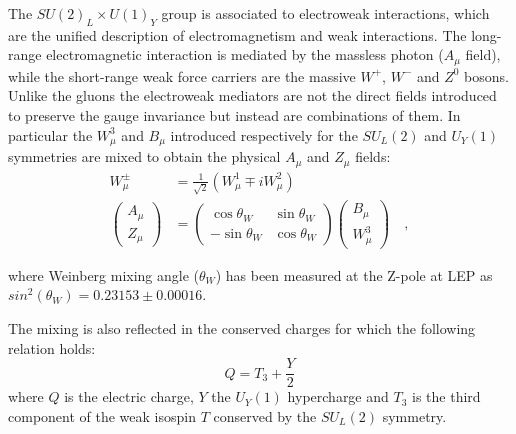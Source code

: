 The $SU(2)_{L} \times U(1)_{Y}$ group is associated to electroweak interactions, which are the
unified description of electromagnetism and weak interactions. The long-range electromagnetic
interaction is mediated by the massless photon ($A_{\mu}$ field), while the short-range weak force carriers are the
massive $W^{+}$, $W^{-}$ and $Z^{0}$ bosons. Unlike the gluons the electroweak mediators
are not the direct fields introduced to preserve the gauge invariance but instead are combinations
of them. In particular the $W_{\mu}^3$ and $B_{\mu}$ introduced respectively for the $SU_L(2)$ and $U_Y(1)$ symmetries
are mixed to obtain the physical $A_{\mu}$ and $Z_{\mu}$ fields:
\[
\begin{split}
  W_{\mu}^{\pm} & = \frac{1}{\sqrt{2}}\left(W_{\mu}^{1}\mp i W_{\mu}^{2}\right) \\
  \left(
  \begin{array}{c}
  A_{\mu} \\ Z_{\mu}
  \end{array}
  \right)
  & =
  \left(
  \begin{array}{cc}
  \cos\theta_{W} & \sin\theta_{W} \\
  -\sin\theta_{W} & \cos\theta_{W}
  \end{array}
  \right)
  \left(
  \begin{array}{c}
  B_{\mu} \\ W_{\mu}^{3}
  \end{array}
  \right) \quad ,
\end{split}
\]

where Weinberg mixing angle ($\theta_W$) has been measured at the Z-pole at LEP as
$sin^2(\theta_W) = 0.23153 \pm 0.00016$.

The mixing is also reflected in the conserved charges for which the following relation holds:
\[
  Q = T_3 + \frac{Y}{2}
\]
where $Q$ is the electric charge, $Y$ the $U_Y(1)$ hypercharge and $T_3$ is the third component of the weak
isospin $T$ conserved by the $SU_L(2)$ symmetry.

